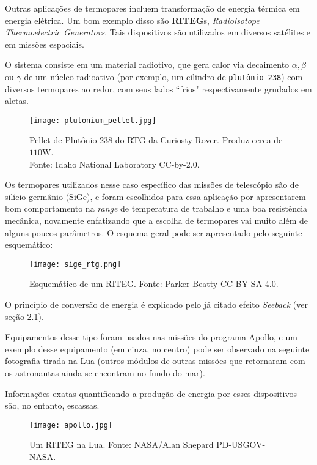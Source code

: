 \documentclass[a4paper,12pt]{report}
\begin{document}
	Outras aplicações de termopares incluem transformação de energia térmica em energia elétrica. Um bom exemplo disso são \textbf{RITEG}s, \textit{Radioisotope Thermoelectric Generators}. Tais dispositivos são utilizados em diversos satélites e em missões espaciais. 
	
	O sistema consiste em um material radiotivo, que gera calor via decaimento $\alpha, \beta$ ou $\gamma$ de um núcleo radioativo (por exemplo, um cilindro de \texttt{plutônio-238}) com diversos termopares ao redor, com seus lados ``frios" respectivamente grudados em aletas.
	
	\begin{figure}[H]
		\centering
		\texttt{[image: plutonium\_pellet.jpg]}\\
		\caption{Pellet de Plutônio-238 do RTG da Curiosty Rover. Produz cerca de $110$W.\\ Fonte: Idaho National Laboratory CC-by-2.0.}
	\end{figure}

	Os termopares utilizados nesse caso específico das missões de telescópio são de silício-germânio (SiGe), e foram escolhidos para essa aplicação por apresentarem bom comportamento na \textit{range} de temperatura de trabalho e uma boa resistência mecânica, novamente enfatizando que a escolha de termopares vai muito além de alguns poucos parâmetros.
\newpage
	O esquema geral pode ser apresentado pelo seguinte esquemático:
	
	\begin{figure}[H]
		\centering
		\texttt{[image: sige\_rtg.png]}\\
		\caption{Esquemático de um RITEG. Fonte: Parker Beatty CC BY-SA 4.0.}
	\end{figure}

	O princípio de conversão de energia é explicado pelo já citado efeito \textit{Seeback} (ver seção 2.1). 
	
	Equipamentos desse tipo foram usados nas missões do programa Apollo, e um exemplo desse equipamento (em cinza, no centro) pode ser observado na seguinte fotografia tirada na Lua (outros módulos de outras missões que retornaram com os astronautas ainda se encontram no fundo do mar).
	
	Informações exatas quantificando a produção de energia por esses dispositivos são, no entanto, escassas.
	
		\begin{figure}[H]
		\centering
		\texttt{[image: apollo.jpg]}\\
		\caption{Um RITEG na Lua. Fonte: NASA/Alan Shepard PD-USGOV-NASA.}
	\end{figure}
	
\end{document}
